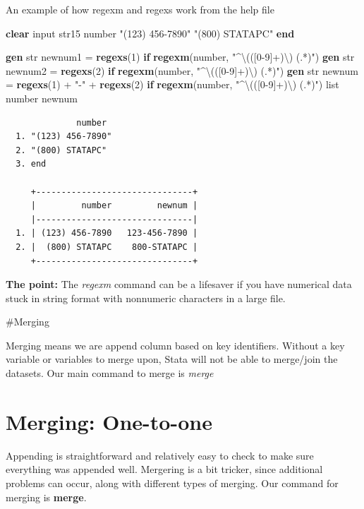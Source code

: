 \documentclass[
]{book}
\newenvironment{Shaded}{\begin{snugshade}}{\end{snugshade}}
\newcommand{\FunctionTok}[1]{\textcolor[rgb]{0.13,0.29,0.53}{\textbf{#1}}}
\newcommand{\KeywordTok}[1]{\textcolor[rgb]{0.13,0.29,0.53}{\textbf{#1}}}
\newcommand{\NormalTok}[1]{#1}
\newcommand{\OtherTok}[1]{\textcolor[rgb]{0.56,0.35,0.01}{#1}}
\newcommand{\StringTok}[1]{\textcolor[rgb]{0.31,0.60,0.02}{#1}}
\begin{document}
An example of how regexm and regexs work from the help file

\begin{Shaded}
\begin{Highlighting}[]
\KeywordTok{clear}
\NormalTok{input str15 number}
\StringTok{"(123) 456{-}7890"}
\StringTok{"(800) STATAPC"}
\KeywordTok{end}

\KeywordTok{gen}\NormalTok{ str newnum1 = }\FunctionTok{regexs}\NormalTok{(1) }\KeywordTok{if} \FunctionTok{regexm}\NormalTok{(number, }\StringTok{"\^{}\textbackslash{}(([0{-}9]+)\textbackslash{}) (.*)"}\NormalTok{)}
\KeywordTok{gen}\NormalTok{ str newnum2 = }\FunctionTok{regexs}\NormalTok{(2) }\KeywordTok{if} \FunctionTok{regexm}\NormalTok{(number, }\StringTok{"\^{}\textbackslash{}(([0{-}9]+)\textbackslash{}) (.*)"}\NormalTok{)}
\KeywordTok{gen}\NormalTok{ str newnum = }\FunctionTok{regexs}\NormalTok{(1) + }\StringTok{"{-}"}\NormalTok{ + }\FunctionTok{regexs}\NormalTok{(2) }\KeywordTok{if} \FunctionTok{regexm}\NormalTok{(number, }\StringTok{"\^{}\textbackslash{}(([0{-}9]+)\textbackslash{}) (.*)"}\NormalTok{)}
\OtherTok{list}\NormalTok{ number newnum}
\end{Highlighting}
\end{Shaded}

\begin{verbatim}
              number
  1. "(123) 456-7890"
  2. "(800) STATAPC"
  3. end

     +-------------------------------+
     |         number         newnum |
     |-------------------------------|
  1. | (123) 456-7890   123-456-7890 |
  2. |  (800) STATAPC    800-STATAPC |
     +-------------------------------+
\end{verbatim}

\textbf{The point:} The \emph{regexm} command can be a lifesaver if you have numerical data stuck in string format with nonnumeric characters in a large file.

\#Merging

Merging means we are append column based on key identifiers. Without a key variable or variables to merge upon, Stata will not be able to merge/join the datasets. Our main command to merge is \emph{merge}

\section{Merging: One-to-one}\label{merging-one-to-one}

Appending is straightforward and relatively easy to check to make sure everything was appended well. Mergering is a bit tricker, since additional problems can occur, along with different types of merging. Our command for merging is \textbf{merge}.
\end{document}
